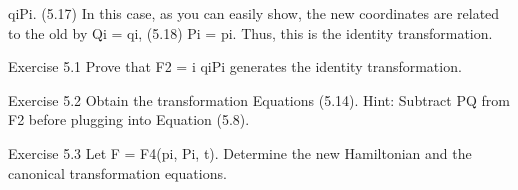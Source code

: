 qiPi.
(5.17)
In this case, as you can easily show, the new coordinates are related to the
old by
Qi = qi,
(5.18)
Pi = pi.
Thus, this is the identity transformation.
\begin{exercise}
Exercise 5.1 Prove that F2 =
i qiPi generates the identity transformation.
\end{exercise}

\begin{exercise}
Exercise 5.2 Obtain the transformation Equations (5.14). Hint: Subtract
PQ from F2 before plugging into Equation (5.8).
\end{exercise}

\begin{exercise}
Exercise 5.3 Let F = F4(pi, Pi, t). Determine the new Hamiltonian and
the canonical transformation equations.

\end{exercise}

